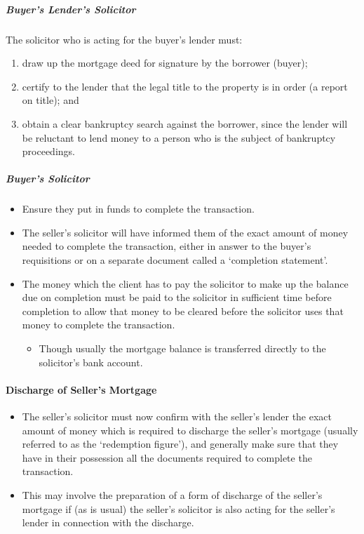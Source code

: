 \documentclass[
]{article}
\providecommand{\tightlist}{%
  \setlength{\itemsep}{0pt}\setlength{\parskip}{0pt}}
\begin{document}
\hypertarget{buyers-lenders-solicitor}{%
\subparagraph{Buyer's Lender's
Solicitor}\label{buyers-lenders-solicitor}}

The solicitor who is acting for the buyer's lender must:

\begin{enumerate}
\def\labelenumi{\arabic{enumi}.}
\tightlist
\item
  draw up the mortgage deed for signature by the borrower (buyer);
\item
  certify to the lender that the legal title to the property is in order
  (a report on title); and
\item
  obtain a clear bankruptcy search against the borrower, since the
  lender will be reluctant to lend money to a person who is the subject
  of bankruptcy proceedings.
\end{enumerate}

\hypertarget{buyers-solicitor}{%
\subparagraph{Buyer's Solicitor}\label{buyers-solicitor}}

\begin{itemize}
\tightlist
\item
  Ensure they put in funds to complete the transaction.
\item
  The seller's solicitor will have informed them of the exact amount of
  money needed to complete the transaction, either in answer to the
  buyer's requisitions or on a separate document called a `completion
  statement'.
\item
  The money which the client has to pay the solicitor to make up the
  balance due on completion must be paid to the solicitor in sufficient
  time before completion to allow that money to be cleared before the
  solicitor uses that money to complete the transaction.

  \begin{itemize}
  \tightlist
  \item
    Though usually the mortgage balance is transferred directly to the
    solicitor's bank account.
  \end{itemize}
\end{itemize}

\hypertarget{discharge-of-sellers-mortgage}{%
\paragraph{Discharge of Seller's
Mortgage}\label{discharge-of-sellers-mortgage}}

\begin{itemize}
\tightlist
\item
  The seller's solicitor must now confirm with the seller's lender the
  exact amount of money which is required to discharge the seller's
  mortgage (usually referred to as the `redemption figure'), and
  generally make sure that they have in their possession all the
  documents required to complete the transaction.
\item
  This may involve the preparation of a form of discharge of the
  seller's mortgage if (as is usual) the seller's solicitor is also
  acting for the seller's lender in connection with the discharge.
\end{itemize}
\end{document}
